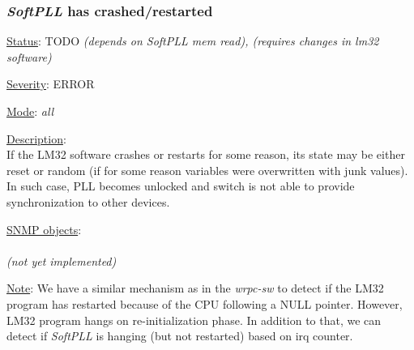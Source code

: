 \subsubsection{\bf \emph{SoftPLL} has crashed/restarted}
		\label{fail:timing:spll_crash}
		\begin{pck_descr}
			\item [] \underline{Status}: TODO \emph{(depends on SoftPLL mem read), (requires changes in lm32 software)}
			\item [] \underline{Severity}: ERROR
			\item [] \underline{Mode}: \emph{all}
			\item [] \underline{Description}:\\
				If the LM32 software crashes or restarts for some reason, its state may
        be either reset or random (if for some reason variables were overwritten
				with junk values). In such case, PLL becomes unlocked and switch is not
				able to provide synchronization to other devices.
			\item [] \underline{SNMP objects}:\\
        {\footnotesize
				\\
         \emph{(not yet implemented)} }
			\item [] \underline{Note}: We have a similar mechanism as in the
				\emph{wrpc-sw} to detect if the LM32 program has restarted because of
				the CPU following a NULL pointer. However, LM32 program hangs on
				re-initialization phase. 
				In addition to that, we can detect if
				\emph{SoftPLL} is hanging (but not restarted) based on irq counter.
		\end{pck_descr}

